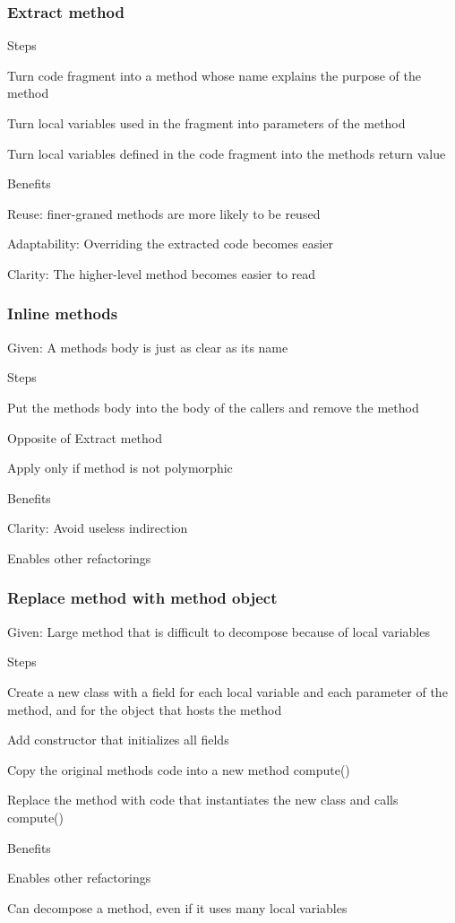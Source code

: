 \subsubsection{Extract method}
\enumstart
	\item Steps
	\enumstart
		\item Turn code fragment into a method whose name explains the purpose of the method
		\item Turn local variables used in the fragment into parameters of the method
		\item Turn local variables defined in the code fragment into the methods return value
	\enumend
	\item Benefits
	\enumstart
		\item Reuse: finer-graned methods are more likely to be reused
		\item Adaptability: Overriding the extracted code becomes easier
		\item Clarity: The higher-level method becomes easier to read
	\enumend
\enumend

\subsubsection{Inline methods}
\enumstart
	\item Given: A methods body is just as clear as its name
	\item Steps
	\enumstart
		\item Put the methods body into the body of the callers and remove the method
	\enumend
	\item Opposite of Extract method
	\item Apply only if method is not polymorphic
	\item Benefits
	\enumstart
		\item Clarity: Avoid useless indirection
		\item Enables other refactorings
	\enumend
\enumend

\subsubsection{Replace method with method object}
\enumstart
	\item Given: Large method that is difficult to decompose because of local variables
	\item Steps
	\enumstart
		\item Create a new class with a field for each local variable and each parameter of the method, and for the object that hosts the method
		\item Add constructor that initializes all fields
		\item Copy the original methods code into a new method compute()
		\item Replace the method with code that instantiates the new class and calls compute()
	\enumend
	\item Benefits
	\enumstart
		\item Enables other refactorings
		\item Can decompose a method, even if it uses many local variables
	\enumend
\enumend

